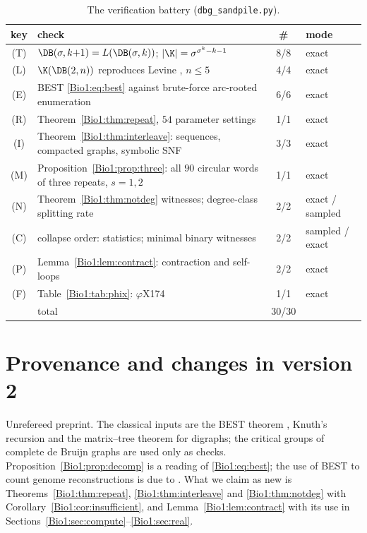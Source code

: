 \begin{table}[ht]
\centering\small
\begin{tabular}{clcl}
\toprule
key & check & \# & mode\\
\midrule
(T) & $\DB(\sigma,k{+}1)=L(\DB(\sigma,k))$; $|\K|=\sigma^{\sigma^{k}-k-1}$ & 8/8 & exact\\
(L) & $\K(\DB(2,n))$ reproduces Levine \cite{Levine}, $n\le5$ & 4/4 & exact\\
(E) & BEST \eqref{Bio1:eq:best} against brute-force arc-rooted enumeration & 6/6 & exact\\
(R) & Theorem~\ref{Bio1:thm:repeat}, $54$ parameter settings & 1/1 & exact\\
(I) & Theorem~\ref{Bio1:thm:interleave}: sequences, compacted graphs, symbolic SNF & 3/3 & exact\\
(M) & Proposition~\ref{Bio1:prop:three}: all $90$ circular words of three repeats, $s=1,2$ & 1/1 & exact\\
(N) & Theorem~\ref{Bio1:thm:notdeg} witnesses; degree-class splitting rate & 2/2 & exact / sampled\\
(C) & collapse order: statistics; minimal binary witnesses & 2/2 & sampled / exact\\
(P) & Lemma~\ref{Bio1:lem:contract}: contraction and self-loops & 2/2 & exact\\
(F) & Table~\ref{Bio1:tab:phix}: $\varphi$X174 & 1/1 & exact\\
\midrule
 & total & 30/30 & \\
\bottomrule
\end{tabular}
\caption{The verification battery (\texttt{dbg\_sandpile.py}).}
\label{Bio1:tab:battery}
\end{table}

\section*{Provenance and changes in version 2}

Unrefereed preprint. The classical inputs are the BEST theorem \cite{AEdB,SmithTutte},
Knuth's recursion \cite{Knuth} and the matrix--tree theorem for digraphs; the critical
groups of complete de Bruijn graphs \cite{Levine,BidkhoriKishore,CHP} are used only as
checks. Proposition~\ref{Bio1:prop:decomp} is a reading of \eqref{Bio1:eq:best}; the use of BEST to
count genome reconstructions is due to \cite{KSP}. What we claim as new is
Theorems~\ref{Bio1:thm:repeat}, \ref{Bio1:thm:interleave} and \ref{Bio1:thm:notdeg} with
Corollary~\ref{Bio1:cor:insufficient}, and Lemma~\ref{Bio1:lem:contract} with its use in
Sections~\ref{Bio1:sec:compute}--\ref{Bio1:sec:real}.

